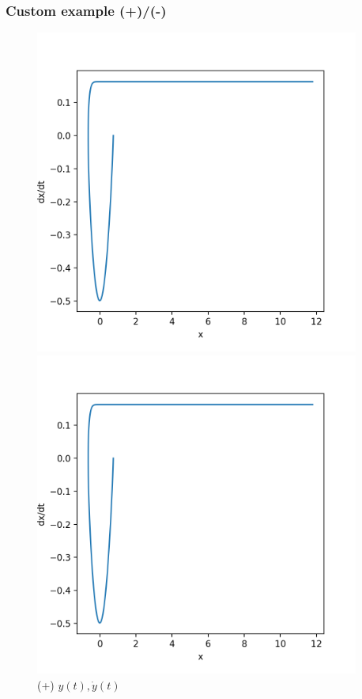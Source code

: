 \documentclass[a4paper,12pt]{article}
\begin{document}
\subsubsection{Custom example (+)/(-)}

\begin{figure}[H]
	\centering
	\begin{minipage}{0.5\textwidth}
		\centering
		\includegraphics[width=0.95\textwidth]{./phase-og-3.png}
		\caption{ (+) $x(t), \dot{x}(t)$ }
	\end{minipage}\hfill
	\begin{minipage}{0.5\textwidth}
		\centering
		\includegraphics[width=0.95\textwidth]{./phase-og-3.png}
		\caption{ (+) $y(t), \dot{y}(t)$ }
	\end{minipage}
\end{figure}
\end{document}
